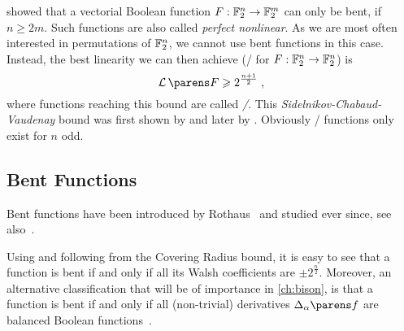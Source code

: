 \textcite{EC:Nyberg91} showed that a vectorial Boolean function $F : \mathbb{F}_2^n \to \mathbb{F}_2^m$ can only be bent, if $n \geqslant 2m$.
Such functions are also called \emph{perfect nonlinear}.
As we are most often interested in permutations of $\mathbb{F}_2^n$, we cannot use bent functions in this case.
Instead, the best linearity we can then achieve (\ie/ for $F : \mathbb{F}_2^n \to \mathbb{F}_2^n$) is
\begin{equation*}
    \linearity{F} \geqslant 2^{\frac{n+1}{2}}\;,
\end{equation*}
where functions reaching this bound are called \emph{\AB/}.
This \emph{Sidelnikov-Chabaud-Vaudenay} bound was first shown by \textcite{SMD:Sidelnikov71} and later by \textcite{EC:ChaVau94}.
Obviously \AB/ functions only exist for $n$ odd.

\subsection{Bent Functions}
Bent functions have been introduced by Rothaus~\cite{Rothaus76} and studied ever since, see also~\cite[Section~8.6]{BMM:Carlet10a}.

Using  and following from the Covering Radius bound, it is easy to see that a function is bent if and only if all its Walsh coefficients are $\pm2^{\frac{n}{2}}$.
Moreover, an alternative classification that will be of importance in \cref{ch:bison}, is that a function is bent if and only if all (non-trivial) derivatives $\derive{\alpha}{f}$ are balanced Boolean functions~\cite{EC:MeiSta89}.

